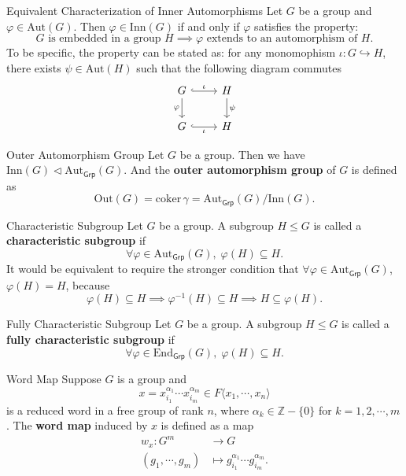 \begin{proposition}{Equivalent
        Characterization of Inner Automorphisms}{}
    Let $G$ be a group and $\varphi \in \mathrm{Aut}(G)$. Then $\varphi \in \mathrm{Inn}(G)$ if and only if $\varphi$ satisfies the property:
    \[
        \text{$G$ is embedded in a group $H$} \implies \text{$\varphi$ extends to an automorphism of $H$}.
    \]
    To be specific, the property can be stated as: for any monomophism $\iota:G\hookrightarrow H$,
    there exists $\psi\in \mathrm{Aut}(H)$ such that the following diagram commutes
    \[
        \begin{tikzcd}[ampersand replacement=\&]
            G \arrow[r, hook, "\iota"] \arrow[d, "\varphi"'] \& H \arrow[d, "\psi"] \\
            G \arrow[r, hook, "\iota"']                      \& H
        \end{tikzcd}
    \]
\end{proposition}




\begin{definition}{Outer Automorphism Group}{}
    Let $G$ be a group. Then we have $\mathrm{Inn}(G) \lhd \mathrm{Aut}_{\mathsf{Grp}}(G)$. And the \textbf{outer automorphism group} of $G$ is defined as
    $$
        \mathrm{Out}(G)=\mathrm{coker}\,\gamma=\mathrm{Aut}_{\mathsf{Grp}}(G)/\mathrm{Inn}(G).
    $$
\end{definition}

\begin{definition}{Characteristic Subgroup}{}
    Let $G$ be a group. A subgroup $H\le G$ is called a \textbf{characteristic subgroup} if
    \[
        \forall \varphi \in\mathrm{Aut}_{\mathsf{Grp}}(G),\; \varphi(H)\subseteq H.
    \]
    It would be equivalent to require the stronger condition that $\forall \varphi \in\mathrm{Aut}_{\mathsf{Grp}}(G)$, $\varphi(H)= H$, because
    \[
        \varphi(H)\subseteq H\implies \varphi^{-1}(H)\subseteq H\implies H\subseteq \varphi(H).
    \]
\end{definition}

\begin{definition}{Fully Characteristic Subgroup}{}
    Let $G$ be a group. A subgroup $H\le G$ is called a \textbf{fully characteristic subgroup} if
    \[
        \forall \varphi \in\mathrm{End}_{\mathsf{Grp}}(G),\; \varphi(H)\subseteq H.
    \]
\end{definition}

\begin{definition}{Word Map}{}
    Suppose $G$ is a group and
    $$
        x=x_{i_1}^{\alpha_{1}}\cdots x_{i_m}^{\alpha_{m}}\in F\langle x_1,\cdots,x_n\rangle
    $$
    is a reduced word in a free group of rank $n$, where $\alpha_k\in\mathbb{Z}-\{0\}$ for $k=1,2,\cdots,m$. The \textbf{word map} induced by $x$ is defined as a map
    \begin{align*}
        w_x:G^m          & \longrightarrow G                                        \\
        (g_1,\cdots,g_m) & \longmapsto g_{i_1}^{\alpha_1}\cdots g_{i_m}^{\alpha_m}.
    \end{align*}
\end{definition}

